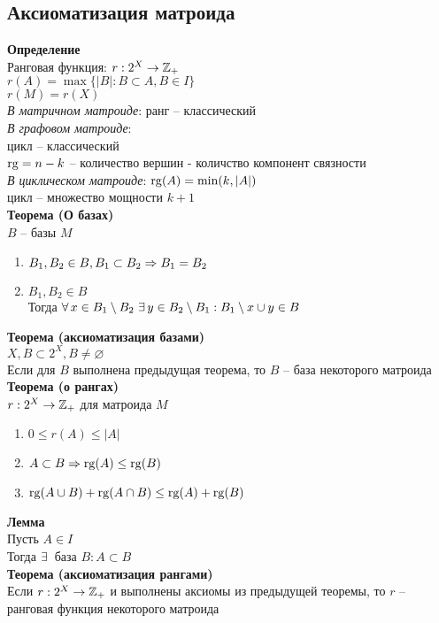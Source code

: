 \documentclass[12pt]{article}
\begin{document}
\subsection{Аксиоматизация матроида}
\textbf{Определение}\\
Ранговая функция: $r: 2^X \rightarrow \mathbb{Z}_+$\\
$r(A) = \max\{|B|: B \subset A, B \in I\}$\\
$r(M) = r(X)$\\
\textit{В матричном матроиде}: ранг -- классический\\
\textit{В графовом матроиде}:\\
цикл -- классический\\
$\operatorname{rg} = n - k$ -- количество вершин - количство компонент связности\\
\textit{В циклическом матроиде}: $\operatorname{rg}(A) = \min(k, |A|)$\\
цикл -- множество мощности $k+1$\\
\textbf{Теорема (О базах)}\\
$B$ -- базы $M$
\begin{enumerate}
    \item $B_1, B_2 \in B, B_1 \subset B_2 \Rightarrow B_1 = B_2$
    \item $B_1, B_2 \in B$\\
    Тогда $\forall\, x \in B_1 \setminus B_2\ \exists\, y\in B_2 \setminus B_1: B_1 \setminus x \cup y \in B$
\end{enumerate}
\textbf{Теорема (аксиоматизация базами)}\\
$X, B \subset 2^X, B \neq \varnothing$\\
Если для $B$ выполнена предыдущая теорема, то $B$ -- база некоторого матроида\\
\textbf{Теорема (о рангах)}\\
$r: 2^X \rightarrow \mathbb{Z}_+$ для матроида $M$
\begin{enumerate}
    \item $0 \leq r(A) \leq |A|$
    \item $A \subset B \Rightarrow \operatorname{rg}(A) \leq \operatorname{rg}(B)$
    \item $\operatorname{rg}(A\cup B) + \operatorname{rg}(A \cap B) \leq \operatorname{rg}(A) + \operatorname{rg}(B)$
\end{enumerate}
\textbf{Лемма}\\
Пусть $A \in I$\\
Тогда $\exists\,$ база $B: A \subset B$\\
\textbf{Теорема (аксиоматизация рангами)}\\
Если $r: 2^X \rightarrow \mathbb{Z}_+$ и выполнены аксиомы из предыдущей теоремы, то $r$ -- ранговая функция некоторого матроида\\
\end{document}

